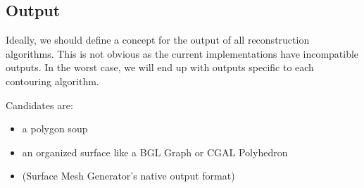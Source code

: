 \subsection{Output}

Ideally, we should define a concept for the output of all reconstruction algorithms.
This is not obvious as the current implementations have incompatible
outputs. In the worst case, we will end up with outputs specific to
each contouring algorithm.

Candidates are:

\begin{itemize}
\item a polygon soup
\item an organized surface like a BGL Graph or CGAL Polyhedron
\item {} (Surface Mesh Generator's
native output format)
\end{itemize}

